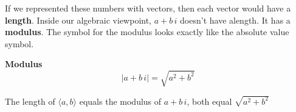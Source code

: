 \documentclass{ximera}
\begin{document}
If we represented these numbers with vectors, then each vector would have a \textbf{length}.  Inside our algebraic viewpoint, $a + b \, i$ doesn't have alength. It has a \textbf{modulus}.  The symbol for the modulus looks exactly like the absolute value symbol.

\begin{definition} \textbf{\textcolor{green!50!black}{Modulus}} \\
\[      |a + b \, i|    = \sqrt{a^2 + b^2}   \]
\end{definition}

The length of $\langle a, b \rangle$ equals the modulus of $a + b \, i$, both equal $\sqrt{a^2 + b^2}$
\end{document}
